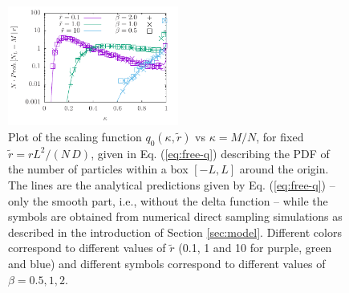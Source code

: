 \documentclass[onecolumn,superscriptaddress,
 amsmath,amssymb,
 aps,
 prd,
]{revtex4-1}
\begin{document}
\begin{figure}[t]
\centering
\includegraphics[width=0.5\textwidth]{fcs-G0.pdf}
\caption{Plot of the scaling function $q_0(\kappa, \tilde r)$ vs $\kappa = M/N$, for fixed $\tilde r = r L^2/(N\,D)$, given 
in Eq. (\ref{eq:free-q}) describing the PDF of the number of particles within a box $[-L, L]$ around the origin. The lines are the analytical predictions given by Eq. (\ref{eq:free-q}) -- only the smooth part, i.e., without the delta function -- while the symbols are obtained from numerical direct sampling simulations as described in the introduction of Section \ref{sec:model}. Different colors correspond to different values of $\tilde r$ (0.1, 1 and 10 for purple, green and blue) and different symbols correspond to different values of $\beta = 0.5,1,2$.}\label{fig:fcs-free}
\end{figure}
\end{document}
